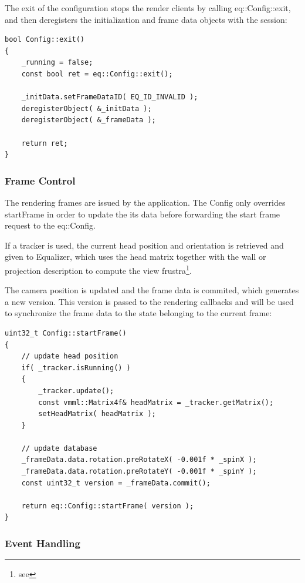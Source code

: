 \documentclass[10pt,a4]{scrartcl}
\begin{document}
The exit of the configuration stops the render clients by calling
\textsf{eq::Config::exit}, and then deregisters the initialization and
frame data objects with the session:

{\footnotesize\begin{lstlisting}
bool Config::exit()
{
    _running = false;
    const bool ret = eq::Config::exit();

    _initData.setFrameDataID( EQ_ID_INVALID );
    deregisterObject( &_initData );
    deregisterObject( &_frameData );

    return ret;
}
\end{lstlisting}}

\subsubsection{Frame Control}

The rendering frames are issued by the application. The \textsf{Config}
only overrides \textsf{startFrame} in order to update the its data
before forwarding the start frame request to the \textsf{eq::Config}.

If a tracker is used, the current head position and orientation is
retrieved and given to Equalizer, which uses the head matrix together
with the wall or projection description to compute the view
frustra\footnote{see
  }. 

The camera position is updated and the frame data is commited, which
generates a new version. This version is passed to the rendering
callbacks and will be used to synchronize the frame data to the state
belonging to the current frame:

{\footnotesize\begin{lstlisting}
uint32_t Config::startFrame()
{
    // update head position
    if( _tracker.isRunning() )
    {
        _tracker.update();
        const vmml::Matrix4f& headMatrix = _tracker.getMatrix();
        setHeadMatrix( headMatrix );
    }

    // update database
    _frameData.data.rotation.preRotateX( -0.001f * _spinX );
    _frameData.data.rotation.preRotateY( -0.001f * _spinY );
    const uint32_t version = _frameData.commit();

    return eq::Config::startFrame( version );
}
\end{lstlisting}}

\subsubsection{Event Handling}
\end{document}

